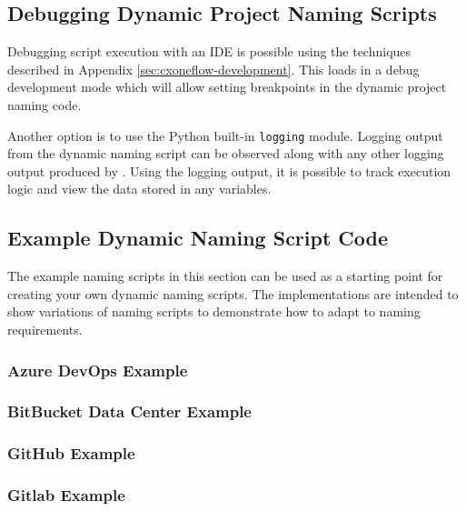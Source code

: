 \subsection{Debugging Dynamic Project Naming Scripts}

Debugging script execution with an IDE is possible using the techniques described in Appendix \ref{sec:cxoneflow-development}.
This loads \cxoneflow in a debug development mode which will allow setting breakpoints in the dynamic project naming code.

Another option is to use the Python built-in \texttt{logging} module.  Logging output from the dynamic naming script can be
observed along with any other logging output produced by \cxoneflowns.  Using the logging output, it is possible to track
execution logic and view the data stored in any variables.

\subsection{Example Dynamic Naming Script Code}

The example naming scripts in this section can be used as a starting point for creating your own
dynamic naming scripts.  The implementations are intended to show variations of naming scripts to
demonstrate how to adapt to naming requirements.

\pagebreak
\subsubsection{Azure DevOps Example}


\pagebreak
\subsubsection{BitBucket Data Center Example}


\pagebreak
\subsubsection{GitHub Example}


\pagebreak
\subsubsection{Gitlab Example}




